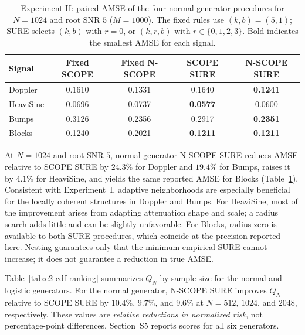 \documentclass[12pt]{article}
\theoremstyle{definition}
\theoremstyle{definition}
\begin{document}
\begin{table}[tbp]
\centering\small
\caption{Experiment II: paired AMSE of the four normal-generator
procedures for $N=1024$ and root SNR $5$ ($M=1000$). The fixed rules use
$(k,b)=(5,1)$; SURE selects $(k,b)$ with $r=0$, or $(k,r,b)$ with
$r\in\{0,1,2,3\}$. Bold indicates the smallest AMSE for each signal.}
\label{tab:e2-normal}
\setlength{\tabcolsep}{5pt}
\begin{tabular}{lcccc}
\toprule
Signal & Fixed SCOPE & Fixed N-SCOPE & SCOPE SURE & N-SCOPE SURE \\
\midrule
Doppler & 0.1610 & 0.1331 & 0.1640 & \textbf{0.1241} \\
HeaviSine & 0.0696 & 0.0737 & \textbf{0.0577} & 0.0600 \\
Bumps & 0.3126 & 0.2356 & 0.2917 & \textbf{0.2351} \\
Blocks & 0.1240 & 0.2021 & \textbf{0.1211} & \textbf{0.1211} \\
\bottomrule
\end{tabular}
\end{table}

At $N=1024$ and root SNR $5$, normal-generator N-SCOPE SURE
reduces AMSE relative to SCOPE SURE by $24.3\%$ for Doppler
and $19.4\%$ for Bumps, raises it by $4.1\%$ for HeaviSine,
and yields the same reported AMSE for Blocks
(Table~\ref{tab:e2-normal}). Consistent with Experiment~I,
adaptive neighborhoods are especially beneficial for the locally
coherent structures in Doppler and Bumps. For HeaviSine, most of
the improvement arises from adapting attenuation shape and scale;
a radius search adds little and can be slightly unfavorable.
For Blocks, radius zero is available to both SURE procedures,
which coincide at the precision reported here. Nesting guarantees
only that the minimum empirical SURE cannot increase; it does
not guarantee a reduction in true AMSE.

Table~\ref{tab:e2-cdf-ranking} summarizes $Q_N$ by sample size
for the normal and logistic generators. For the normal generator,
N-SCOPE SURE improves $Q_N$ relative to SCOPE SURE by
$10.4\%$, $9.7\%$, and $9.6\%$ at $N=512$, $1024$, and $2048$,
respectively. These values are \emph{relative reductions in
normalized risk}, not percentage-point differences. Section~S5
reports scores for all six generators.
\end{document}
